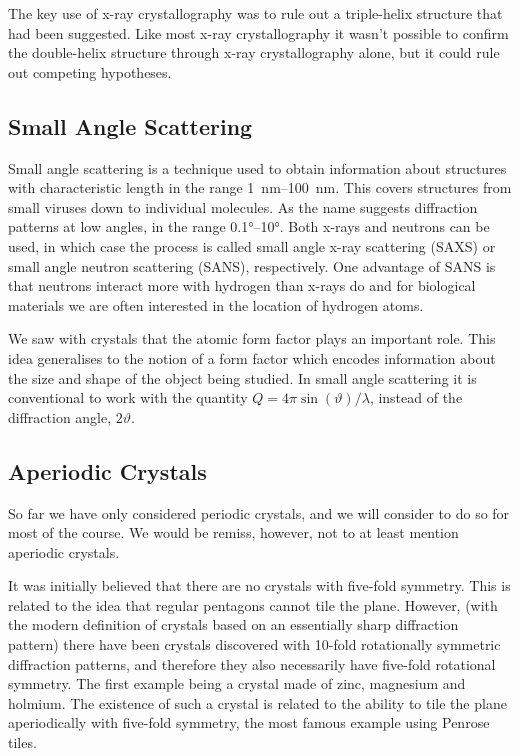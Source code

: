 \documentclass[fleqn]{NotesClass}
\begin{document}
    The key use of x-ray crystallography was to rule out a triple-helix structure that had been suggested.
    Like most x-ray crystallography it wasn't possible to confirm the double-helix structure through x-ray crystallography alone, but it could rule out competing hypotheses.
    
    \subsection{Small Angle Scattering}
    Small angle scattering is a technique used to obtain information about structures with characteristic length in the range \qtyrange{1}{100}{\nano\metre}.
    This covers structures from small viruses down to individual molecules.
    As the name suggests diffraction patterns at low angles, in the range \ang{0.1}--\ang{10}.
    Both x-rays and neutrons can be used, in which case the process is called small angle x-ray scattering (SAXS) or small angle neutron scattering (SANS), respectively.
    One advantage of SANS is that neutrons interact more with hydrogen than x-rays do and for biological materials we are often interested in the location of hydrogen atoms.
    
    We saw with crystals that the atomic form factor plays an important role.
    This idea generalises to the notion of a form factor which encodes information about the size and shape of the object being studied.
    In small angle scattering it is conventional to work with the quantity \(Q = 4\pi\sin(\vartheta)/\lambda\), instead of the diffraction angle, \(2\vartheta\).
    
    \subsection{Aperiodic Crystals}
    So far we have only considered periodic crystals, and we will consider to do so for most of the course.
    We would be remiss, however, not to at least mention aperiodic crystals.
    
    It was initially believed that there are no crystals with five-fold symmetry.
    This is related to the idea that regular pentagons cannot tile the plane.
    However, (with the modern definition of crystals based on an essentially sharp diffraction pattern) there have been crystals discovered with 10-fold rotationally symmetric diffraction patterns, and therefore they also necessarily have five-fold rotational symmetry.
    The first example being a crystal made of zinc, magnesium and holmium.
    The existence of such a crystal is related to the ability to tile the plane aperiodically with five-fold symmetry, the most famous example using Penrose tiles.
    
\end{document}
